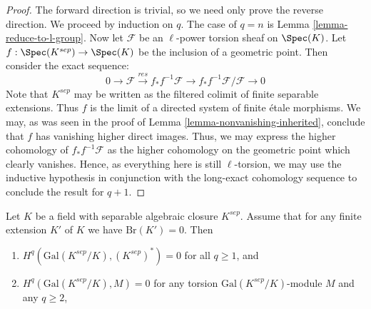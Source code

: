 \begin{proof}
The forward direction is trivial, so we need only prove the reverse direction. 
We proceed by induction on $q$. The case of $q = n$ is
Lemma \ref{lemma-reduce-to-l-group}. Now let 
$\mathcal{F}$ be an $\ell$-power torsion sheaf on $\Spec(K)$.
Let $f : \Spec(K^{sep}) \rightarrow \Spec(K)$
be the inclusion of a geometric point.
Then consider the exact sequence:
$$
0 \rightarrow \mathcal{F} \xrightarrow{res}
f_* f^{-1} \mathcal{F} \rightarrow f_* f^{-1} \mathcal{F}/\mathcal{F} 
\rightarrow 0
$$
Note that $K^{sep}$ may be written as the filtered colimit of finite 
separable extensions. Thus $f$
is the limit of a directed system of finite \'etale  morphisms.
We may, as was seen in the proof of
Lemma \ref{lemma-nonvanishing-inherited}, conclude that $f$ has 
vanishing higher direct images. Thus, we may express the higher cohomology of 
$f_* f^{-1} \mathcal{F}$ as the higher cohomology on the geometric point which 
clearly vanishes. Hence, as everything here is still $\ell$-torsion, we may use 
the inductive hypothesis in conjunction with the long-exact cohomology sequence 
to conclude the result for $q + 1$.
\end{proof}

\begin{proposition}
\label{proposition-serre-galois}
\begin{reference}
\cite[Chapter II, Section 3, Proposition 5]{SerreGaloisCohomology}
\end{reference}
Let $K$ be a field with separable algebraic closure $K^{sep}$.
Assume that for any finite extension $K'$ of $K$ we have
$\text{Br}(K') = 0$. Then
\begin{enumerate}
\item $H^q(\text{Gal}(K^{sep}/K), (K^{sep})^*) = 0$
for all $q \geq 1$, and
\item $H^q(\text{Gal}(K^{sep}/K), M) = 0$
for any torsion $\text{Gal}(K^{sep}/K)$-module $M$ and any $q \geq 2$,
\end{enumerate}
\end{proposition}

